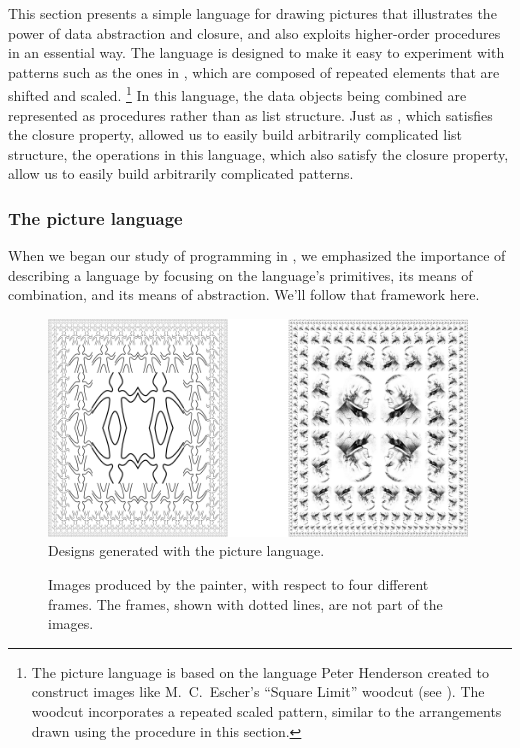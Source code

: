 This section presents a simple language for drawing pictures that illustrates the power of data abstraction and closure, and also exploits higher-order procedures in an essential way.
The language is designed to make it easy to experiment with patterns such as the ones in , which are composed of repeated elements that are shifted and scaled.%
\footnote{
	The picture language is based on the language Peter Henderson created to construct images like M.~C.~Escher’s “Square Limit” woodcut (see ).
	The woodcut incorporates a repeated scaled pattern, similar to the arrangements drawn using the  procedure in this section.
}
In this language, the data objects being combined are represented as procedures rather than as list structure.
Just as , which satisfies the closure property, allowed us to easily build arbitrarily complicated list structure, the operations in this language, which also satisfy the closure property, allow us to easily build arbitrarily complicated patterns.



\subsubsection*{The picture language}

When we began our study of programming in , we emphasized the importance of describing a language by focusing on the language’s primitives, its means of combination, and its means of abstraction.
We’ll follow that framework here.

\begin{figure}[tb]
	\centering
	\includegraphics[width=111mm]{fig/chap2/Fig2.9-bigger.png}
	\caption{
		Designs generated with the picture language.
	}
	\label{Figure 2.9}
\end{figure}

\begin{figure}[tb]
	\centering
	
	\caption{
		Images produced by the  painter, with respect to four different frames.
		The frames, shown with dotted lines, are not part of the images.
	}
	\label{Figure 2.10}
\end{figure}

